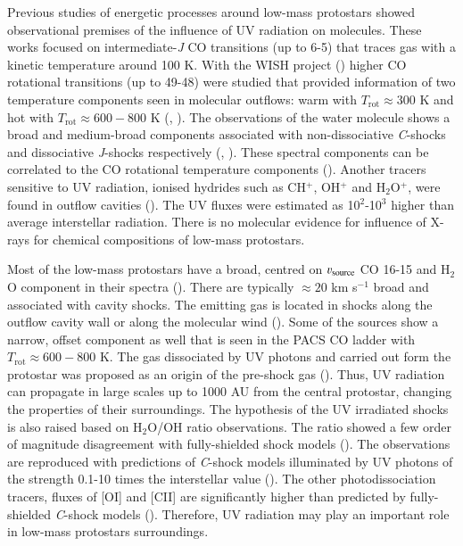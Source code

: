 \documentclass{aa}
\begin{document}

Previous studies of energetic processes around low-mass protostars showed observational premises of
the influence of UV radiation on molecules. These works focused on intermediate-\textit{J} CO
transitions (up to 6-5) that traces gas with a kinetic temperature around 100 K. With the WISH project (\citealt{vDi11}) higher CO
rotational transitions (up to 49-48) were studied that provided information of two temperature
components seen in molecular outflows: warm with $T_\mathrm{rot} \approx 300$ K and hot with
$T_\mathrm{rot} \approx 600-800$ K (\citealt{Kar13}, \citealt{Gre13}). The observations of the water
molecule shows a broad and medium-broad components associated with non-dissociative \textit{C}-shocks and dissociative \textit{J}-shocks respectively (\citealt{Kri13}, \citealt{Mot14}). These
spectral components can be correlated to the CO rotational temperature components (\citealt{Kri17}).
Another tracers sensitive to UV radiation, ionised hydrides such as CH$^+$, OH$^+$ and H$_2$O$^+$,
were found in outflow cavities (\citealt{Ben16}). The UV fluxes were estimated as 10$^2$-10$^3$
higher than average interstellar radiation. There is no molecular evidence for influence of X-rays
for chemical compositions of low-mass protostars.

Most of the low-mass protostars have a broad, centred on $\varv_{\mathrm{source}}$ CO 16-15 and
H$_2$O component in their spectra (\citealt{Kri17}). There are typically $\approx 20$ km s$^{-1}$
broad and associated with cavity shocks. The emitting gas is located in shocks along the outflow
cavity wall or along the molecular wind (\citealt{Yva16}). Some of the sources show a
narrow, offset component as well that is seen in the PACS CO ladder with $T_\mathrm{rot} \approx
600-800$ K. The gas dissociated by UV photons and carried out form the protostar was proposed as an
origin of the pre-shock gas (\citealt{Kri17}). Thus, UV radiation can propagate in large
scales up to 1000 AU from the central protostar, changing the properties of their surroundings. The
hypothesis of the UV irradiated shocks is also raised based on H$_2$O/OH ratio observations. The
ratio showed a few order of magnitude disagreement with fully-shielded shock models
(\citealt{Kar14}). The observations are reproduced with predictions of \mbox{\textit{C}-shock} models
illuminated by UV photons of the strength 0.1-10 times the interstellar value (\citealt{Mel15}). The
other photodissociation tracers, fluxes of [OI] and [CII] are significantly higher than predicted by
fully-shielded \mbox{\textit{C}-shock} models (\citealt{Kar18}). Therefore, UV radiation may play
an important role in low-mass protostars surroundings.
\end{document}
